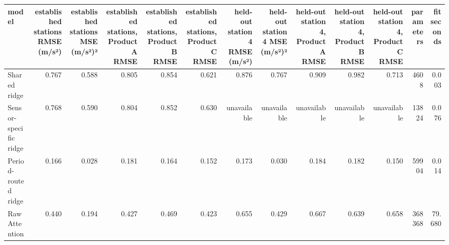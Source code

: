 \begin{tabular}{lrrrrrrrrrrrr}
\toprule
model & established stations RMSE (m/s²) & established stations MSE (m/s²)² & established stations, Product A RMSE & established stations, Product B RMSE & established stations, Product C RMSE & held-out station 4 RMSE (m/s²) & held-out station 4 MSE (m/s²)² & held-out station 4, Product A RMSE & held-out station 4, Product B RMSE & held-out station 4, Product C RMSE & parameters & fit seconds \\
\midrule
Shared ridge & 0.767 & 0.588 & 0.805 & 0.854 & 0.621 & 0.876 & 0.767 & 0.909 & 0.982 & 0.713 & 4608 & 0.003 \\
Sensor-specific ridge & 0.768 & 0.590 & 0.804 & 0.852 & 0.630 & unavailable & unavailable & unavailable & unavailable & unavailable & 13824 & 0.076 \\
Period-routed ridge & 0.166 & 0.028 & 0.181 & 0.164 & 0.152 & 0.173 & 0.030 & 0.184 & 0.182 & 0.150 & 59904 & 0.014 \\
Raw Attention & 0.440 & 0.194 & 0.427 & 0.469 & 0.423 & 0.655 & 0.429 & 0.667 & 0.639 & 0.658 & 368368 & 79.680 \\
\bottomrule
\end{tabular}
